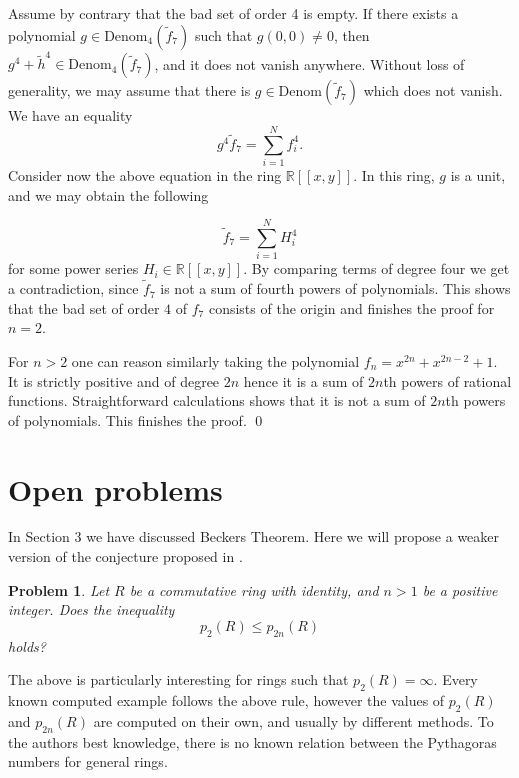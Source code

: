 \documentclass[12pt,reqno]{amsart}   	%
\newtheorem{prob}[thm]{Problem}
\theoremstyle{remark}
\newcommand{\R}{\mathbb{R}}
\begin{document}
Assume by contrary that the bad set of order 4 is empty.
If there exists a polynomial $g \in \mathrm{Denom}_4(\widetilde{f}_7)$ such that $g(0,0)\neq 0$, then $g^{4}+\widetilde{h}^{4} \in \mathrm{Denom}_4(\widetilde{f}_7)$, and it does not vanish anywhere. Without loss of generality, we may assume that there is $g \in \mathrm{Denom}(\widetilde{f}_7)$ which does not vanish. We have an equality
\begin{equation}\label{rownanko}
    g^4\widetilde{f}_7=\sum_{i=1}^Nf_i^4.
\end{equation}
Consider now the above equation in the ring $\R[[x,y]]$. In this ring, $g$ is a unit, and we may obtain the following

$$\widetilde{f}_7 = \sum_{i=1}^N H_i^4$$
for some power series $H_i \in \R[[x,y]]$.
By comparing terms of degree four we get a contradiction, since $\widetilde{f}_7$ is not a sum of fourth powers of polynomials. This shows that the bad set of order $4$ of $f_7$ consists of the origin and finishes the proof for $n=2$.

For $n>2$ one can reason similarly taking the polynomial $f_n=x^{2n}+x^{2n-2}+1$. It is strictly positive and of degree $2n$ hence it is a sum of $2n$th powers of rational functions. Straightforward calculations shows that it is not a sum of $2n$th powers of polynomials.
This finishes the proof.
\hfill \qed





















\section{Open problems}
In Section 3 we have discussed Beckers Theorem. Here we will propose a weaker version of the conjecture proposed in \cite{kv2023}.
\begin{prob}
    

Let $R$ be a commutative ring with identity, and $n>1$ be a positive integer.
Does the inequality 
$$ p_2(R)\leq p_{2n}(R)$$
 holds?

\end{prob}
The above is particularly interesting for rings such that $p_2(R)=\infty$. Every known computed example follows the above rule, however the values of $p_2(R)$ and $p_{2n}(R)$ are computed on their own, and usually by different methods. To the authors best knowledge, there is no known relation between the Pythagoras numbers for general rings.
\end{document}
